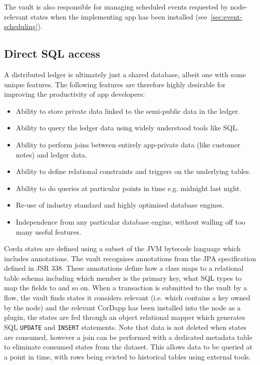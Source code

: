 \documentclass{article}
\begin{document}
The vault is also responsible for managing scheduled events requested by node-relevant states when the implementing
app has been installed (see~\cref{sec:event-scheduling}).

\subsection{Direct SQL access}\label{subsec:direct-sql-access}

A distributed ledger is ultimately just a shared database, albeit one with some unique features. The following
features are therefore highly desirable for improving the productivity of app developers:

\begin{itemize}
\item Ability to store private data linked to the semi-public data in the ledger.
\item Ability to query the ledger data using widely understood tools like SQL.
\item Ability to perform joins between entirely app-private data (like customer notes) and ledger data.
\item Ability to define relational constraints and triggers on the underlying tables.
\item Ability to do queries at particular points in time e.g. midnight last night.
\item Re-use of industry standard and highly optimised database engines.
\item Independence from any particular database engine, without walling off too many useful features.
\end{itemize}

Corda states are defined using a subset of the JVM bytecode language which includes annotations. The vault
recognises annotations from the JPA specification defined in JSR 338\cite{JPA}. These annotations define how a class maps to a relational table schema including which member is the
primary key, what SQL types to map the fields to and so on. When a transaction is submitted to the vault by a flow,
the vault finds states it considers relevant (i.e. which contains a key owned by the node) and the relevant CorDapp
has been installed into the node as a plugin, the states are fed through an object relational mapper which
generates SQL \texttt{UPDATE} and \texttt{INSERT} statements. Note that data is not deleted when states are
consumed, however a join can be performed with a dedicated metadata table to eliminate consumed states from the
dataset. This allows data to be queried at a point in time, with rows being evicted to historical tables using
external tools.
\end{document}

